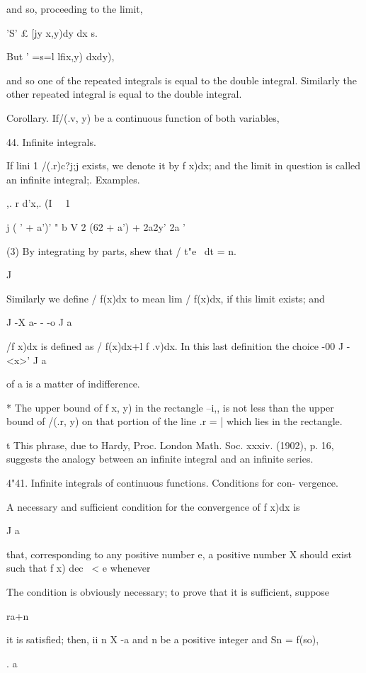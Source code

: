 and so, proceeding to the limit,

'S' £ [jy x,y)dy dx s.

But ' =s=l lfix,y) dxdy),

and so one of the repeated integrals is equal to the double integral.
Similarly the other repeated integral is equal to the double integral.

Corollary. If/(.v, y) be a continuous function of both variables,

44. Infinite integrals.

If lini 1 /(.r)c?j;j exists, we denote it by f x)dx; and the limit in
question is called an infinite integral;. Examples.

,. r d'x,. (I \ \ 1

  j ( ' + a')' " b V 2 (62 + a') + 2a2y' 2a '

(3) By integrating by parts, shew that / t"e~ dt = n. 

J

Similarly we define / f(x)dx to mean lim / f(x)dx, if this limit
exists; and

J -X a- - -o J a

/f x)dx is defined as / f(x)dx+l f .v)dx. In this last definition the
choice -00 J -<x>' J a

of a is a matter of indifference.

* The upper bound of f x, y) in the rectangle --i,, is not less than
the upper bound of /(.r, y) on that portion of the line .r = | which
lies in the rectangle.

t This phrase, due to Hardy, Proc. London Math. Soc. xxxiv. (1902), p.
16, suggests the analogy between an infinite integral and an infinite
series.

%
%

4"41. Infinite integrals of continuous functions. Conditions for con-
vergence.

A necessary and sufficient condition for the convergence of f x)dx is

J a

that, corresponding to any positive number e, a positive number X
should exist such that f x) dec \ < e whenever

The condition is obviously necessary; to prove that it is sufficient,
suppose

ra+n

it is satisfied; then, ii n X -a and n be a positive integer and Sn =
f(so),

. a

